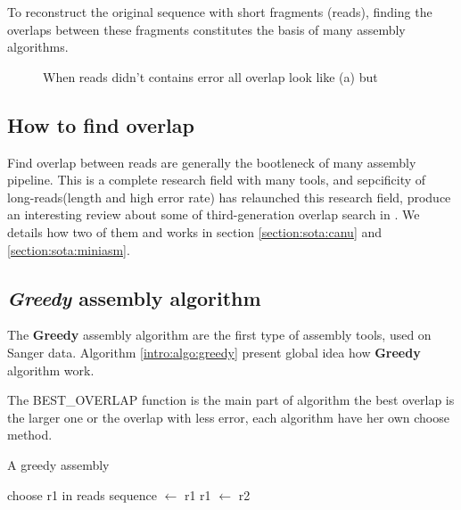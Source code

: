 \documentclass[./main.tex]{subfiles}
\begin{document}
To reconstruct the original sequence with short fragments (reads), finding the overlaps between these fragments constitutes the basis of many assembly algorithms.

\begin{figure}[ht]
    \centering
    \caption{When reads didn't contains error all overlap look like (a) but}
    \label{intro:fig:overlap}
\end{figure}

\subsection{How to find overlap}

Find overlap between reads are generally the bootleneck of many assembly pipeline. 
This is a complete research field with many tools, and sepcificity of long-reads(length and high error rate) has relaunched this research field, \citeauthor{ovl_bench} produce an interesting review about some of third-generation overlap search in \cite{ovl_bench}. We details how two of them \mhap and \minimap works in section \ref{section:sota:canu} and \ref{section:sota:miniasm}.

\subsection{\textit{Greedy} assembly algorithm}

The \textbf{Greedy} assembly algorithm are the first type of assembly tools, used on Sanger data. Algorithm \ref{intro:algo:greedy} present global idea how \textbf{Greedy} algorithm work.

The BEST\_OVERLAP function is the main part of algorithm the best overlap is the larger one or the overlap with less error, each algorithm have her own choose method.

\begin{algorithm}[ht]
    \caption{A greedy assembly}
    \begin{algorithmic}[1]
        \State choose r1 in reads
        \State sequence $\leftarrow$ r1
            \State {}
            \State {}
            \State r1 $\leftarrow$ r2
        \EndWhile
    \EndFunction
    \end{algorithmic}
    \label{intro:algo:greedy}
\end{algorithm}
\end{document}

